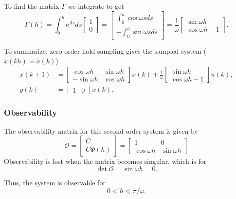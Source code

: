 \documentclass{scrartcl}
\newcommand*{\mexp}[1]{\ensuremath{\mathrm{e}^{#1}}}
\newcommand*{\bbm}{\begin{bmatrix}}
\newcommand*{\ebm}{\end{bmatrix}}
\newcommand*{\obsmatrix}{\mathcal{O}}
\newcommand*{\cwh}{\ensuremath{\cos \omega h}}
\newcommand*{\swh}{\ensuremath{\sin \omega h}}
\begin{document}
To find the matrix $\Gamma$ we integrate to get
\begin{equation*}
\Gamma(h) = \int_0^h \mexp{As}ds\bbm 1\\0\ebm = \bbm \int_0^h \cos \omega s ds \\ -\int_0^h \sin \omega s ds \ebm  = \frac{1}{\omega} \bbm \sin \omega h \\ \cos \omega h - 1 \ebm.
\end{equation*}

To summarize, zero-order hold sampling gives the sampled system ($x(kh) = x(k)$)
\begin{align*}
x(k+1) &= \bbm \cos \omega h & \sin \omega h\\ -\sin \omega h & \cos \omega h \ebm x(k) + 
          \frac{1}{\omega} \bbm \sin \omega h \\ \cos \omega h - 1 \ebm u(k), \\
y(k) &= \bbm 1 & 0 \ebm x(k).
\end{align*}
\subsubsection{Observability}
\label{sec-2-2-2}

The observability matrix for this second-order system is given by
\[
\obsmatrix = \bbm C \\ C\Phi(h) \ebm
           = \bbm 1 & 0\\ \cwh & \swh \ebm
\]
Observability is lost when the matrix becomes singular, which is for
\[
\det \obsmatrix = \swh = 0.
\]

Thus, the system is observable for 
\[ 0 < h < \pi/\omega. \]
\end{document}
